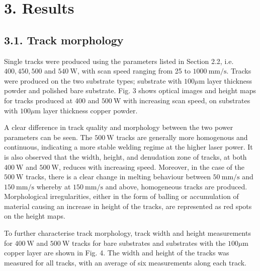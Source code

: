 \documentclass[10pt]{article}
\begin{document}
\section*{3. Results}
\subsection*{3.1. Track morphology}
Single tracks were produced using the parameters listed in Section 2.2, i.e. $400,450,500$ and $540 \mathrm{~W}$, with scan speed ranging from 25 to $1000 \mathrm{~mm} / \mathrm{s}$. Tracks were produced on the two substrate types; substrate with $100 \mu \mathrm{m}$ layer thickness powder and polished bare substrate. Fig. 3 shows optical images and height maps for tracks produced at 400 and $500 \mathrm{~W}$ with increasing scan speed, on substrates with $100 \mu \mathrm{m}$ layer thickness copper powder.

A clear difference in track quality and morphology between the two power parameters can be seen. The $500 \mathrm{~W}$ tracks are generally more homogenous and continuous, indicating a more stable welding regime at the higher laser power. It is also observed that the width, height, and denudation zone of tracks, at both $400 \mathrm{~W}$ and $500 \mathrm{~W}$, reduces with increasing speed. Moreover, in the case of the $500 \mathrm{~W}$ tracks, there is a clear change in melting behaviour between $50 \mathrm{~mm} / \mathrm{s}$ and $150 \mathrm{~mm} / \mathrm{s}$ whereby at $150 \mathrm{~mm} / \mathrm{s}$ and above, homogeneous tracks are produced. Morphological irregularities, either in the form of balling or accumulation of material causing an increase in height of the tracks, are represented as red spots on the height maps.

To further characterise track morphology, track width and height measurements for $400 \mathrm{~W}$ and $500 \mathrm{~W}$ tracks for bare substrates and substrates with the $100 \mu \mathrm{m}$ copper layer are shown in Fig. 4. The width and height of the tracks was measured for all tracks, with an average of six measurements along each track.
\end{document}
